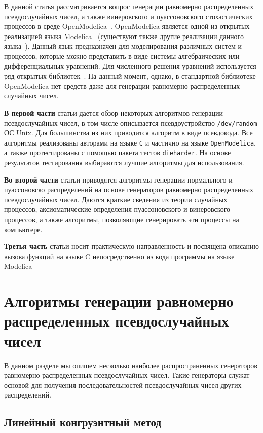 \documentclass[%
floatfix,
showkeys,
nofootinbib, %
superscriptaddress, %
]{revtex4-1}
\begin{document}
В данной статья рассматривается вопрос генерации равномерно
распределенных псевдослучайных чисел, а также винеровского и
пуассоновского стохастических процессов в среде
OpenModelica~\cite{L_OpenModelica}. OpenModelica является одной из
открытых реализацией языка Modelica~\cite{L_Modelica} (существуют
также другие реализации данного языка~\cite{L_SciLab, L_LMS, L_Dymola,
  L_JModelica, L_WolframSystemModeler, L_MapleSim}). Данный язык
предназначен для моделирования различных систем и процессов, которые
можно представить в виде системы алгебраических или дифференциальных
уравнений. Для численного решения уравнений используется ряд открытых
библиотек~\cite{L_lis:2016, L_LAPACK:2016, L_UMFPACK:2016,
  L_KINSOL:2015}. На данный момент, однако, в стандартной библиотеке
OpenModelica нет средств даже для генерации равномерно распределенных
случайных чисел.

\textbf{В первой части} статьи дается обзор некоторых алгоритмов
генерации псевдослучайных чисел, в том числе описывается
псевдоустройство \texttt{/dev/random} ОС Unix. Для большинства из них
приводится алгоритм в виде псевдокода. Все алгоритмы реализованы
авторами на языке \texttt{C} и частично на языке
\texttt{OpenModelica}, а также протестированы с помощью пакета тестов
\texttt{dieharder}. На основе результатов тестирования выбираются
лучшие алгоритмы для использования.

\textbf{Во второй части} статьи приводятся алгоритмы генерации
нормального и пуассоновско распределений на основе генераторов
равномерно распределенных псевдослучайных чисел. Даются краткие
сведения из теории случайных процессов, аксиоматические определения
пуассоновского и винеровского процессов, а также алгоритмы,
позволяющие генерировать эти процессы на компьютере.

\textbf{Третья часть} статьи носит практическую направленность и
посвящена описанию вызова функций на языке C непосредственно из кода
программы на языке Modelica

\section{Алгоритмы генерации равномерно распределенных псевдослучайных
  чисел}

В данном разделе мы опишем несколько наиболее распространенных
генераторов равномерно распределенных псевдослучайных чисел. Такие
генераторы служат основой для получения последовательностей
псевдослучайных чисел других распределений.

\subsection{Линейный конгруэнтный метод}
\end{document}
